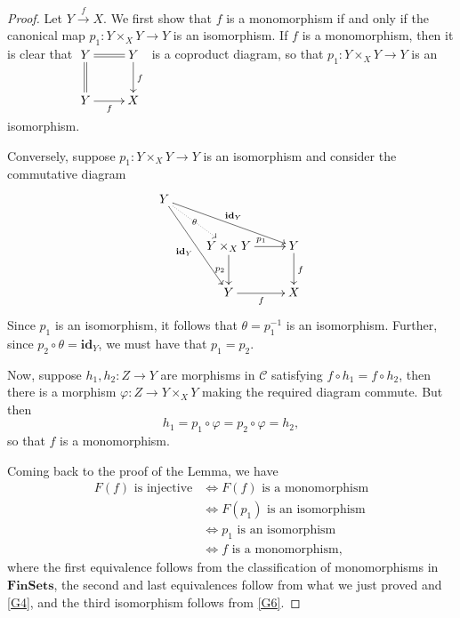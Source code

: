 \documentclass[10pt]{article}
\theoremstyle{thmstyle}
\theoremstyle{defstyle}
\newcommand{\catFinSets}{\mathbf{FinSets}}
\newcommand{\id}{\mathbf{id}}
\newcommand{\scrC}{\mathscr{C}} %
\begin{document}
\begin{proof}
    Let $Y\xrightarrow{f} X$. We first show that $f$ is a monomorphism if and only if the canonical map $p_1: Y\times_X Y\to Y$ is an isomorphism. If $f$ is a monomorphism, then it is clear that $\xymatrix{
        Y\ar@{=}[r]\ar@{=}[d] & Y\ar[d]^f\\
        Y\ar[r]_f & X
    }$
    is a coproduct diagram, so that $p_1: Y\times_X Y\to Y$ is an isomorphism.

    Conversely, suppose $p_1: Y\times_X Y\to Y$ is an isomorphism and consider the commutative diagram 
    \begin{equation*}
        \xymatrix {
            Y\ar[rrd]^{\id_Y}\ar[rdd]_{\id_Y}\ar@{.>}[rd]|-{\theta} & & \\
            & Y\times_X Y\ar[r]^{p_1}\ar[d]_{p_2} & Y\ar[d]^f\\
            & Y\ar[r]_f & X
        }
    \end{equation*}
    Since $p_1$ is an isomorphism, it follows that $\theta = p_1^{-1}$ is an isomorphism. Further, since $p_2\circ\theta = \id_Y$, we must have that $p_1 = p_2$.

    Now, suppose $h_1, h_2: Z\to Y$ are morphisms in $\scrC$ satisfying $f\circ h_1 = f\circ h_2$, then there is a morphism $\varphi: Z\to Y\times_X Y$ making the required diagram commute. But then 
    \begin{equation*}
        h_1 = p_1\circ\varphi = p_2\circ\varphi = h_2,
    \end{equation*}
    so that $f$ is a monomorphism.  

    Coming back to the proof of the Lemma, we have 
    \begin{align*}
        F(f)\text{ is injective} &\iff F(f) \text{ is a monomorphism}\\
        &\iff F(p_1) \text{ is an isomorphism}\\
        &\iff  p_1\text{ is an isomorphism}\\
        &\iff f\text{ is a monomorphism},
    \end{align*}
    where the first equivalence follows from the classification of monomorphisms in $\catFinSets$, the second and last equivalences follow from what we just proved and \ref{G4}, and the third isomorphism follows from \ref{G6}.
\end{proof}
\end{document}
